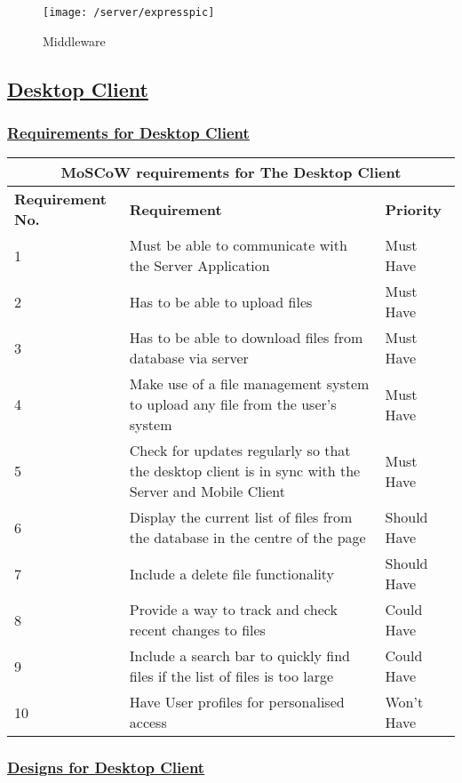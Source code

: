 \documentclass{article}
\begin{document}
\begin{figure}[h!]
\texttt{[image: /server/expresspic]}
\captionsetup{justification=centering}
\caption{Middleware}
\end{figure}

\subsection{\underline{Desktop Client}}

\subsubsection{\underline{Requirements for Desktop Client}}
\begin{tabular}{|p{3cm}|p{5cm}|p{4cm}|}
\hline
\multicolumn{3}{|c|}{\textbf{MoSCoW requirements for The Desktop Client}} \\
\hline
\textbf{Requirement No.} & \textbf{Requirement} & \textbf{Priority}\\
\hline
1 & Must be able to communicate with the Server Application & Must Have \\
\hline
2 & Has to be able to upload files & Must Have \\
\hline
3 & Has to be able to download files from database via server & Must Have \\
\hline
4 & Make use of a file management system to upload any file from the user's system & Must Have \\
\hline
5 & Check for updates regularly so that the desktop client is in sync with the Server and Mobile Client & Must Have\\
\hline
6 & Display the current list of files from the database in the centre of the page & Should Have \\
\hline
7 & Include a delete file functionality   & Should Have \\
\hline
8 & Provide a way to track and check recent changes to files & Could Have\\
\hline
9 & Include a search bar to quickly find files if the list of files is too large & Could Have \\
\hline
10 & Have User profiles for personalised access & Won't Have \\
\hline
\end{tabular}

\subsubsection{\underline{Designs for Desktop Client}}
\end{document}
